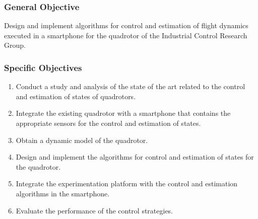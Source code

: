 \subsubsection{General Objective}
Design and implement algorithms for control and estimation of flight dynamics executed in a smartphone for the quadrotor of the Industrial Control Research Group.
\subsubsection{Specific Objectives}
\begin{enumerate}
\item Conduct a study and analysis of the state of the art related to the control and estimation of states of quadrotors.
\item Integrate the existing quadrotor with a smartphone that contains the appropriate sensors for the control and estimation of states.
\item Obtain a dynamic model of the quadrotor.
\item Design and implement the algorithms for control and estimation of states for the quadrotor.
\item Integrate the experimentation platform with the control and estimation algorithms in the smartphone.
\item Evaluate the performance of the control strategies.%
\end{enumerate}

